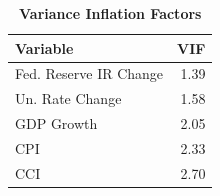 \vspace{0.8em}
\begin{table}[H]
\centering
\caption{\textbf{Variance Inflation Factors}}
\vspace{0.8em}
\label{tab:vif}
\renewcommand{\arraystretch}{1.4}
\normalsize
\begin{tabularx}{0.8\textwidth}{Xr}
\toprule
\textbf{Variable} & \textbf{VIF} \\
\midrule
Fed. Reserve IR Change & 1.39 \\
Un. Rate Change & 1.58 \\
GDP Growth & 2.05 \\
CPI & 2.33 \\
CCI & 2.70 \\
\bottomrule
\end{tabularx}
\end{table}

